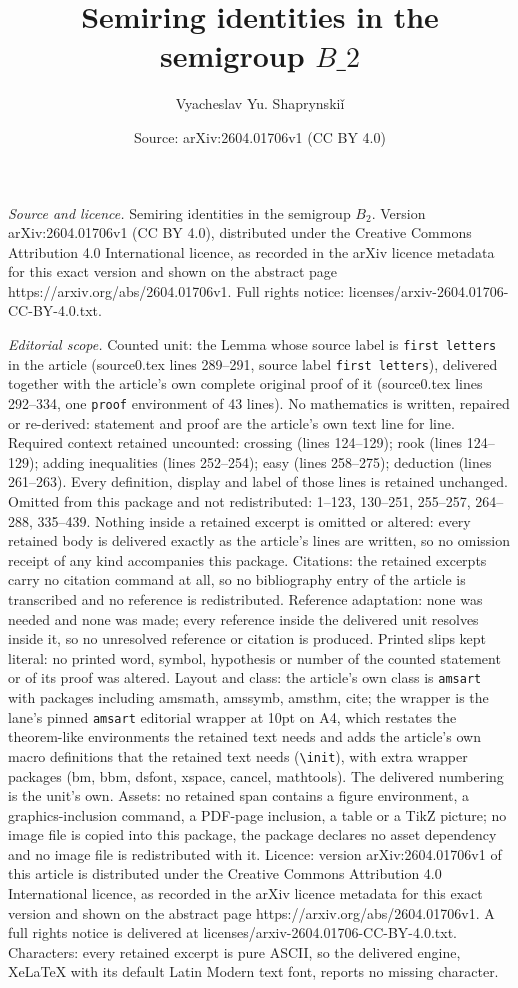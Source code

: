 \documentclass[10pt,a4paper]{amsart}
\title[Semiring identities in the semigroup $B\_2$]{Semiring identities in the semigroup $B\_2$}
\author{Vyacheslav Yu. Shaprynski\v{i}}
\date{Source: arXiv:2604.01706v1 (CC BY 4.0)}
\begin{document}
\maketitle

\noindent\emph{Source and licence.} Semiring identities in the semigroup $B_2$. Version arXiv:2604.01706v1 (CC BY 4.0), distributed under the Creative Commons Attribution 4.0 International licence, as recorded in the arXiv licence metadata for this exact version and shown on the abstract page https://arxiv.org/abs/2604.01706v1. Full rights notice: licenses/arxiv-2604.01706-CC-BY-4.0.txt.\par\smallskip

\noindent\textit{Editorial scope.} Counted unit: the Lemma whose source label is \texttt{first letters} in the article (source0.tex lines 289--291, source label \texttt{first letters}), delivered together with the article's own complete original proof of it (source0.tex lines 292--334, one \texttt{proof} environment of 43 lines). No mathematics is written, repaired or re-derived: statement and proof are the article's own text line for line. Required context retained uncounted: crossing (lines 124--129); rook (lines 124--129); adding inequalities (lines 252--254); easy (lines 258--275); deduction (lines 261--263). Every definition, display and label of those lines is retained unchanged. Omitted from this package and not redistributed: 1--123, 130--251, 255--257, 264--288, 335--439. Nothing inside a retained excerpt is omitted or altered: every retained body is delivered exactly as the article's lines are written, so no omission receipt of any kind accompanies this package. Citations: the retained excerpts carry no citation command at all, so no bibliography entry of the article is transcribed and no reference is redistributed. Reference adaptation: none was needed and none was made; every reference inside the delivered unit resolves inside it, so no unresolved reference or citation is produced. Printed slips kept literal: no printed word, symbol, hypothesis or number of the counted statement or of its proof was altered. Layout and class: the article's own class is \texttt{amsart} with packages including amsmath, amssymb, amsthm, cite; the wrapper is the lane's pinned \texttt{amsart} editorial wrapper at 10pt on A4, which restates the theorem-like environments the retained text needs and adds the article's own macro definitions that the retained text needs (\texttt{\textbackslash init}), with extra wrapper packages (bm, bbm, dsfont, xspace, cancel, mathtools). The delivered numbering is the unit's own. Assets: no retained span contains a figure environment, a graphics-inclusion command, a PDF-page inclusion, a table or a TikZ picture; no image file is copied into this package, the package declares no asset dependency and no image file is redistributed with it. Licence: version arXiv:2604.01706v1 of this article is distributed under the Creative Commons Attribution 4.0 International licence, as recorded in the arXiv licence metadata for this exact version and shown on the abstract page https://arxiv.org/abs/2604.01706v1. A full rights notice is delivered at licenses/arxiv-2604.01706-CC-BY-4.0.txt. Characters: every retained excerpt is pure ASCII, so the delivered engine, XeLaTeX with its default Latin Modern text font, reports no missing character.
\end{document}
